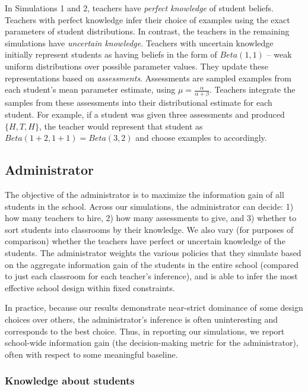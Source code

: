 \documentclass[man]{apa6}
\begin{document}
In Simulations 1 and 2, teachers have \emph{perfect knowledge} of
student beliefs. Teachers with perfect knowledge infer their choice of
examples using the exact parameters of student distributions. In
contrast, the teachers in the remaining simulations have \emph{uncertain
knowledge}. Teachers with uncertain knowledge initially represent
students as having beliefs in the form of \(Beta(1,1)\) -- weak uniform
distributions over possible parameter values. They update these
representations based on \emph{assessments}. Assessments are sampled
examples from each student's mean parameter estimate, using
\(\mu = \frac{\alpha}{\alpha + \beta}\). Teachers integrate the samples
from these assessments into their distributional estimate for each
student. For example, if a student was given three assessments and
produced \(\{H, T, H\}\), the teacher would represent that student as
\(Beta(1+2,1+1) = Beta(3,2)\) and choose examples to accordingly.

\subsection{Administrator}\label{administrator}

The objective of the administrator is to maximize the information gain
of all students in the school. Across our simulations, the administrator
can decide: 1) how many teachers to hire, 2) how many assessments to
give, and 3) whether to sort students into classrooms by their
knowledge. We also vary (for purposes of comparison) whether the
teachers have perfect or uncertain knowledge of the students. The
administrator weights the various policies that they simulate based on
the aggregate information gain of the students in the entire school
(compared to just each classroom for each teacher's inference), and is
able to infer the most effective school design within fixed constraints.

In practice, because our results demonstrate near-strict dominance of
some design choices over others, the administrator's inference is often
uninteresting and corresponds to the best choice. Thus, in reporting our
simulations, we report school-wide information gain (the decision-making
metric for the administrator), often with respect to some meaningful
baseline.

\subsubsection{Knowledge about students}\label{knowledge-about-students}
\end{document}
